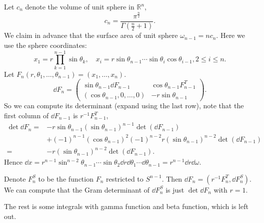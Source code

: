 Let $c_n$ denote the volume of unit sphere in $\mathbb{R}^n$,
\[
c_n = \frac{\pi^{\frac{n}{2}}}{\Gamma(\frac{n}{2}+1)}.
\]
We claim in advance that the surface area of unit sphere $\omega_{n-1} = nc_n$.
Here we use the sphere coordinates:
\[
x_1 = r\prod_{k=1}^{n-1} \sin\theta_k,\quad
x_i = r\sin\theta_{n-1}\cdots \sin\theta_i\cos\theta_{i-1}, 2\le i\le n.
\]
Let $F_n(r, \theta_1, \dots, \theta_{n-1}) = (x_1,\dots,x_n)$.
\[
\dd F_n = \begin{pmatrix}
	\sin \theta_{n-1}\dd F_{n-1} & \cos\theta_{n-1}F_{n-1}^T\\
	(\cos\theta_{n-1}, 0, \dots, 0) & -r\sin\theta_{n-1}
\end{pmatrix}.
\]
So we can compute its determinant (expand using the last row),
note that the first column of $\dd F_{n-1}$ is $r^{-1}F_{n-1}^T$,
\begin{align*}
\det \dd F_n = &-r\sin\theta_{n-1}(\sin\theta_{n-1})^{n-1}\det(\dd F_{n-1})\\
&+ (-1)^{n-1}(\cos \theta_{n-1})^2
(-1)^{n-2}r(\sin\theta_{n-1})^{n-2}\det(\dd F_{n-1})\\
= &-r(\sin\theta_{n-1})^{n-2} \det(\dd F_{n-1}).
\end{align*}
Hence $\dd x = r^{n-1}\sin^{n-2}\theta_{n-1}\cdots \sin\theta_2 \dd r
\dd \theta_1 \cdots \dd \theta_{n-1} = r^{n-1} \dd r\dd \omega$.

Denote $F_n^S$ to be the function $F_n$ restricted to $S^{n-1}$.
Then $\dd F_n = (r^{-1} F_n^T, \dd F_n^S)$.
We can compute that the Gram determinant of $\dd F_n^S$ is just $\det\dd F_n$ with
$r = 1$.

The rest is some integrals with gamma function and beta function, which is left out.
